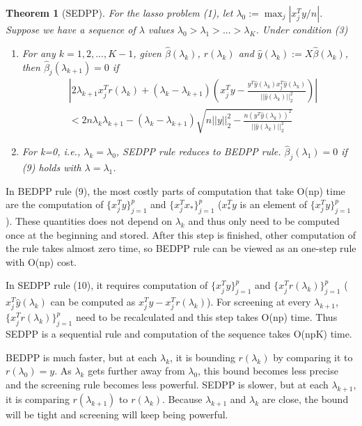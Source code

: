 \documentclass{article}
\newtheorem{theorem}{Theorem}[section]
\begin{document}
\begin{theorem}[SEDPP]
    For the lasso problem (1), let $\lambda_0:=\max_j|x_j^Ty/n|$. Suppose we have a sequence of $\lambda$ values $\lambda_0>\lambda_1>...>\lambda_K$. Under condition (3)
    \begin{enumerate}
        \item For any $k=1,2,...,K-1$, given $\hat{\beta}(\lambda_k)$, $r(\lambda_k)$ and $\hat{y}(\lambda_k):=X\hat{\beta}(\lambda_k)$, then $\hat{\beta}_j(\lambda_{k+1})=0$ if
        \begin{equation}
            \begin{split}
                &\left|2\lambda_{k+1}x_j^Tr(\lambda_k)+(\lambda_k-\lambda_{k+1})\left( x_j^Ty-\frac{y^T\hat{y}(\lambda_k)x_j^T\hat{y}(\lambda_k)}{||\hat{y}(\lambda_k)||_2^2}\right)\right|\\&<2n\lambda_k\lambda_{k+1}-(\lambda_k-\lambda_{k+1})\sqrt{n||y||_2^2-\frac{n(y^T\hat{y}(\lambda_k))^2}{||\hat{y}(\lambda_k)||_2^2}}
            \end{split}
        \end{equation}
        \item For k=0, i.e., $\lambda_k=\lambda_0$, SEDPP rule reduces to BEDPP rule. $\hat{\beta}_j(\lambda_1)=0$ if (9) holds with $\lambda=\lambda_1$.
    \end{enumerate}
\end{theorem}

In BEDPP rule (9), the most costly parts of computation that take O(np) time are the computation of $\{x_j^Ty\}_{j=1}^p$ and $\{x_j^Tx_*\}_{j=1}^p$ ($x_*^Ty$ is an element of $\{x_j^Ty\}_{j=1}^p$). These quantities does not depend on $\lambda_k$ and thus only need to be computed once at the beginning and stored. After this step is finished, other computation of the rule takes almost zero time, so BEDPP rule can be viewed as an one-step rule with O(np) cost.

In SEDPP rule (10), it requires computation of $\{x_j^Ty\}_{j=1}^p$ and $\{x_j^Tr(\lambda_k)\}_{j=1}^p$ ($x_j^T\hat{y}(\lambda_k)$ can be computed as $x_j^Ty-x_j^Tr(\lambda_k)$). For screening at every $\lambda_{k+1}$, $\{x_j^Tr(\lambda_k)\}_{j=1}^p$ need to be recalculated and this step takes O(np) time. Thus SEDPP is a sequential rule and computation of the sequence takes O(npK) time.

BEDPP is much faster, but at each $\lambda_k$, it is bounding $r(\lambda_k)$ by comparing it to $r(\lambda_0)=y$. As $\lambda_k$ gets further away from $\lambda_0$, this bound becomes less precise and the screening rule becomes less powerful. SEDPP is slower, but at each $\lambda_{k+1}$, it is comparing $r(\lambda_{k+1})$ to $r(\lambda_k)$. Because $\lambda_{k+1}$ and $\lambda_k$ are close, the bound will be tight and screening will keep being powerful.
\end{document}
